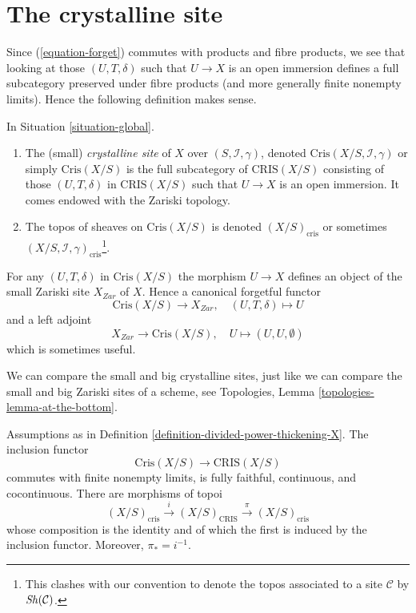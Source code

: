\section{The crystalline site}
\label{section-site}

\noindent
Since (\ref{equation-forget}) commutes with products and fibre
products, we see that looking at those $(U, T, \delta)$ such that
$U \to X$ is an open immersion defines a full
subcategory preserved under fibre products (and more generally
finite nonempty limits). Hence the following
definition makes sense.

\begin{definition}
\label{definition-crystalline-site}
In Situation \ref{situation-global}.
\begin{enumerate}
\item The (small) {\it crystalline site} of $X$ over
$(S, \mathcal{I}, \gamma)$, denoted $\text{Cris}(X/S, \mathcal{I}, \gamma)$
or simply $\text{Cris}(X/S)$ is the full subcategory of $\text{CRIS}(X/S)$
consisting of those $(U, T, \delta)$ in $\text{CRIS}(X/S)$ such that
$U \to X$ is an open immersion. It comes endowed with the Zariski topology.
\item The topos of sheaves on $\text{Cris}(X/S)$ is denoted
$(X/S)_{\text{cris}}$ or sometimes
$(X/S, \mathcal{I}, \gamma)_{\text{cris}}$\footnote{This clashes with
our convention to denote the topos associated to a site $\mathcal{C}$
by $\mathop{\mathit{Sh}}\nolimits(\mathcal{C})$.}.
\end{enumerate}
\end{definition}

\noindent
For any $(U, T, \delta)$ in $\text{Cris}(X/S)$ the morphism $U \to X$
defines an object of the small Zariski site $X_{Zar}$ of $X$. Hence
a canonical forgetful functor
\begin{equation}
\label{equation-forget-small}
\text{Cris}(X/S) \longrightarrow X_{Zar},\quad
(U, T, \delta) \longmapsto U
\end{equation}
and a left adjoint
\begin{equation}
\label{equation-endow-trivial-small}
X_{Zar} \longrightarrow \text{Cris}(X/S),\quad
U \longmapsto (U, U, \emptyset)
\end{equation}
which is sometimes useful.

\medskip\noindent
We can compare the small and big crystalline sites, just like
we can compare the small and big Zariski sites of a scheme, see
Topologies, Lemma \ref{topologies-lemma-at-the-bottom}.

\begin{lemma}
\label{lemma-compare-big-small}
Assumptions as in Definition \ref{definition-divided-power-thickening-X}.
The inclusion functor
$$
\text{Cris}(X/S) \to \text{CRIS}(X/S)
$$
commutes with finite nonempty limits, is fully faithful, continuous,
and cocontinuous. There are morphisms of topoi
$$
(X/S)_{\text{cris}} \xrightarrow{i} (X/S)_{\text{CRIS}}
\xrightarrow{\pi} (X/S)_{\text{cris}}
$$
whose composition is the identity and of which the first is induced
by the inclusion functor. Moreover, $\pi_* = i^{-1}$.
\end{lemma}

